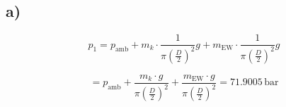 

\subsection*{a)}
\[
p_1 = p_{\text{amb}} + m_k \cdot \frac{1}{\pi \left( \frac{D}{2} \right)^2} g + m_{\text{EW}} \cdot \frac{1}{\pi \left( \frac{D}{2} \right)^2} g
\]

\[
= p_{\text{amb}} + \frac{m_k \cdot g}{\pi \left( \frac{D}{2} \right)^2} + \frac{m_{\text{EW}} \cdot g}{\pi \left( \frac{D}{2} \right)^2} = 71.9005 \, \text{bar}
\]